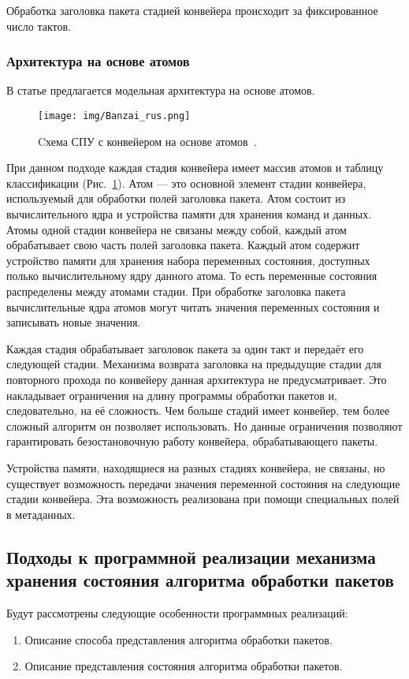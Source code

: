 \documentclass[conference]{IEEEtran}
\begin{document}
Обработка заголовка пакета стадией конвейера происходит за фиксированное
число тактов.

\subsubsection{Архитектура на основе атомов}
В статье \cite{bib:Sivaraman:Banzai} предлагается модельная архитектура на
основе атомов.

\begin{figure}
	\centering
	\texttt{[image: img/Banzai\_rus.png]}
	\caption{Cхема СПУ с конвейером на основе
	атомов~\cite{bib:Sivaraman:Banzai}.}
	\label{float:app:banzai}
\end{figure}

При данном подходе каждая стадия конвейера имеет массив атомов и таблицу
классификации (Рис.~\ref{float:app:banzai}).
Атом --- это основной элемент стадии конвейера, используемый для обработки
полей заголовка пакета. Атом состоит из вычислительного ядра и устройства
памяти для
хранения команд и данных.
Атомы одной стадии конвейера не связаны между собой, каждый атом обрабатывает
свою часть полей заголовка пакета. Каждый атом содержит устройство памяти
для хранения набора переменных состояния, доступных полько вычислительному
ядру данного атома. То есть переменные состояния распределены между
атомами стадии. При обработке заголовка пакета вычислительные ядра атомов
могут читать значения переменных состояния и записывать новые значения.

Каждая стадия обрабатывает заголовок пакета за один такт и передаёт его
следующей стадии. Механизма возврата заголовка на предыдущие стадии для
повторного прохода по конвейеру данная архитектура не предусматривает.
Это накладывает ограничения на длину программы обработки пакетов и,
следовательно, на её сложность. Чем больше стадий имеет конвейер, тем более
сложный алгоритм он позволяет использовать. Но данные ограничения
позволяют гарантировать безостановочную работу конвейера, обрабатывающего
пакеты.

Устройства памяти, находящиеся на разных стадиях конвейера, не связаны,
но существует возможность передачи значения переменной состояния на
следующие стадии конвейера. Эта возможность реализована при помощи
специальных полей в метаданных.

\subsection{Подходы к программной реализации механизма хранения состояния
алгоритма обработки пакетов}
Будут рассмотрены следующие особенности программных реализаций:
\begin{enumerate}
	\item Описание способа представления алгоритма обработки пакетов.
	\item Описание представления состояния алгоритма обработки пакетов.
\end{enumerate}
\end{document}
